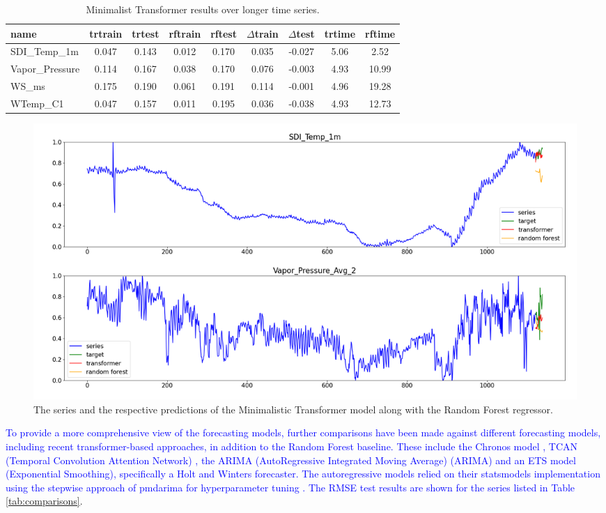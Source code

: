 \documentclass[algorithms,article,submit,pdftex,moreauthors]{Definitions/mdpi}
\begin{document}
\begin{table}[H]
	\caption{Minimalist Transformer results over longer time series.}
	\label{tab:long}
	\centering
	\begin{tabular}{l cccccccc}
		\toprule
		name & trtrain & trtest & rftrain & rftest & $\Delta$train & $\Delta$test & trtime & rftime  \\
		\midrule
		\small SDI\_Temp\_1m 	& 0.047 & 0.143 & 0.012 & 0.170 & 0.035 & -0.027 & 5.06 & 2.52  \\
 		\small Vapor\_Pressure	& 0.114 & 0.167 & 0.038 & 0.170 & 0.076 & -0.003 & 4.93 & 10.99 \\
 		\small WS\_ms 				& 0.175 & 0.190 & 0.061 & 0.191 & 0.114 & -0.001 & 4.96 & 19.28 \\
 		\small WTemp\_C1 			& 0.047 & 0.157 & 0.011 & 0.195 & 0.036 & -0.038 & 4.93 & 12.73 \\
		\bottomrule
	\end{tabular}
\end{table}

\begin{figure}
	\centering
	\includegraphics[width=1.0\linewidth]{long.png}
	\caption{The series and the respective predictions of the Minimalistic Transformer model along with the Random Forest regressor.}
	\label{fig:long}
\end{figure}

\textcolor{blue}{To provide a more comprehensive view of the forecasting models, further comparisons have been made against different forecasting models, including recent transformer-based approaches, in addition to the Random Forest baseline. These include the Chronos model \cite{chronos}, TCAN (Temporal Convolution Attention Network) \cite{tcan}, the ARIMA (AutoRegressive Integrated Moving Average) (ARIMA) and an ETS model (Exponential Smoothing), specifically a Holt and Winters forecaster. The autoregressive models relied on their statsmodels implementation \cite{SP10} using the stepwise approach of pmdarima for hyperparameter tuning \cite{S17}. The RMSE test results are shown for the series listed in Table \ref{tab:comparisons}}.
\end{document}
